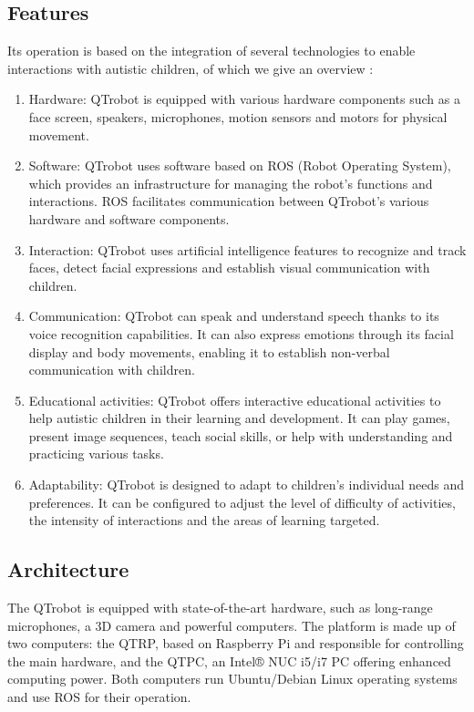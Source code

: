 \subsection{Features}

Its operation is based on the integration of several technologies to enable interactions with autistic children, of which we give an overview :\\
\begin{enumerate}

\item Hardware: QTrobot is equipped with various hardware components such as a face screen, speakers, microphones, motion sensors and motors for physical movement.
\\
\item Software: QTrobot uses software based on ROS (Robot Operating System), which provides an infrastructure for managing the robot's functions and interactions. ROS facilitates communication between QTrobot's various hardware and software components.
\\
\item Interaction: QTrobot uses artificial intelligence features to recognize and track faces, detect facial expressions and establish visual communication with children.
\\
\item Communication: QTrobot can speak and understand speech thanks to its voice recognition capabilities. It can also express emotions through its facial display and body movements, enabling it to establish non-verbal communication with children.

\item Educational activities: QTrobot offers interactive educational activities to help autistic children in their learning and development. It can play games, present image sequences, teach social skills, or help with understanding and practicing various tasks.

\item Adaptability: QTrobot is designed to adapt to children's individual needs and preferences. It can be configured to adjust the level of difficulty of activities, the intensity of interactions and the areas of learning targeted.\\
\end{enumerate}

\subsection{Architecture}
 The QTrobot is equipped with state-of-the-art hardware, such as long-range microphones, a 3D camera and powerful computers. The platform is made up of two computers: the QTRP, based on Raspberry Pi and responsible for controlling the main hardware, and the QTPC, an Intel® NUC i5/i7 PC offering enhanced computing power. Both computers run Ubuntu/Debian Linux operating systems and use ROS for their operation.

